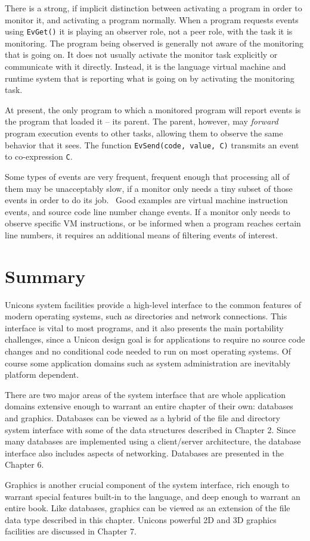 There is a strong, if implicit distinction between activating a program
in order to monitor it, and activating a program normally. When a
program requests events using \texttt{EvGet()} it is playing an
observer role, not a peer role, with the task it is monitoring. The
program being observed is generally not aware of the monitoring that is
going on. It does not usually activate the monitor task explicitly or
communicate with it directly. Instead, it is the language virtual
machine and runtime system that is reporting what is going on by
activating the monitoring task.

At present, the only program to which a monitored program will report
events is the program that loaded it -- its parent. The parent,
however, may \textit{forward} program execution events to other tasks,
allowing them to observe the same behavior that it sees. The function
\texttt{EvSend(code, value, C)} transmits an event to co-expression
\texttt{C}.

Some types of events are very frequent, frequent enough that processing
all of them may be unacceptably slow, if a monitor only needs a tiny
subset of those events in order to do its job. \ Good examples are
virtual machine instruction events, and source code line number change
events. If a monitor only needs to observe specific VM instructions, or
be informed when a program reaches certain line numbers, it requires an
additional means of filtering events of interest.

\section*{Summary}

Unicon{\textquotesingle}s system facilities provide a high-level
interface to the common features of modern operating systems, such
as directories and network connections. This interface is vital to most
programs, and it also presents the main portability challenges,
since a Unicon design goal is for applications to require no
source code changes and no conditional code needed
to run on most operating systems. Of course some application domains
such as system administration are inevitably platform dependent.

There are two major areas of the system interface that are whole
application domains extensive enough to warrant an entire chapter of
their own: databases and graphics. Databases can be
viewed as a hybrid of the file and directory system interface with some
of the data structures described in Chapter 2. Since many databases are
implemented using a client/server architecture, the database interface
also includes aspects of networking. Databases are presented in the
Chapter 6.

Graphics is another crucial component of the system interface, rich
enough to warrant special features built-in to the language, and deep
enough to warrant an entire book. Like databases, graphics can be
viewed as an extension of the file data type described in this chapter.
Unicon{\textquotesingle}s powerful 2D and 3D graphics facilities are
discussed in Chapter 7.

